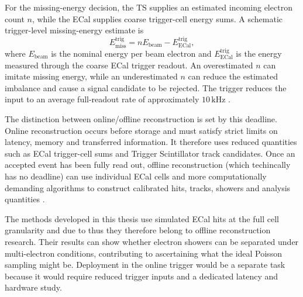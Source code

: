 For the missing-energy decision, the TS supplies an estimated incoming
electron count \(n\), while the ECal supplies coarse trigger-cell energy
sums. A schematic trigger-level missing-energy estimate is
\begin{equation}
    E_{\mathrm{miss}}^{\mathrm{trig}}
    =
    nE_{\mathrm{beam}} - E_{\mathrm{ECal}}^{\mathrm{trig}} ,
\end{equation}
where \(E_{\mathrm{beam}}\) is the nominal energy per beam electron and
\(E_{\mathrm{ECal}}^{\mathrm{trig}}\) is the energy measured through the
coarse ECal trigger readout. An overestimated \(n\) can imitate missing
energy, while an underestimated \(n\) can reduce the estimated imbalance and
cause a signal candidate to be rejected. The trigger reduces the input to an
average full-readout rate of approximately \(10\,\mathrm{kHz}\)
\cite{ldmx2025-overview}.

The distinction between online/offline reconstruction is set by this
deadline. Online reconstruction occurs before storage and must satisfy strict
limits on latency, memory and transferred information. It therefore uses
reduced quantities such as ECal trigger-cell sums and Trigger Scintillator
track candidates. Once an accepted event has been fully read out, offline
reconstruction (which techincally has no deadline) can use individual ECal cells and more computationally
demanding algorithms to construct calibrated hits, tracks, showers and
analysis quantities \cite{ldmx2025-overview}.


The methods developed in this thesis use simulated ECal hits at the full cell
granularity and due to thus they
therefore belong to offline reconstruction research. Their results can show
whether electron showers can be separated under multi-electron conditions, contributing to ascertaining what the ideal Poisson sampling might be.
Deployment in the online trigger would be a separate task because it would
require reduced trigger inputs and a dedicated latency and hardware study.

